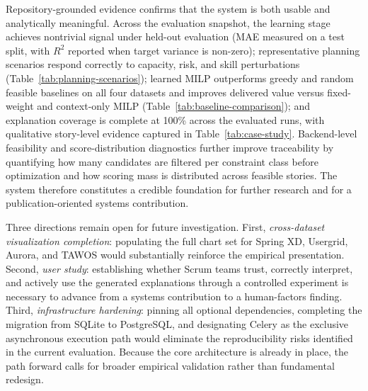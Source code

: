 \documentclass[conference]{IEEEtran}
\begin{document}
Repository-grounded evidence confirms that the system is both usable and
analytically meaningful.
Across the evaluation snapshot, the learning stage achieves nontrivial signal
under held-out evaluation (MAE measured on a test split, with $R^2$ reported when
target variance is non-zero); representative planning scenarios respond
correctly to capacity, risk, and skill perturbations
(Table~\ref{tab:planning-scenarios}); learned MILP outperforms greedy and random
feasible baselines on all four datasets and improves delivered value versus
fixed-weight and context-only MILP (Table~\ref{tab:baseline-comparison}); and explanation
coverage is complete at 100\% across the evaluated runs, with qualitative
story-level evidence captured in Table~\ref{tab:case-study}.
Backend-level feasibility and score-distribution diagnostics further improve
traceability by quantifying how many candidates are filtered per constraint class
before optimization and how scoring mass is distributed across feasible stories.
The system therefore constitutes a credible foundation for further research and for
a publication-oriented systems contribution.

Three directions remain open for future investigation.
First, \emph{cross-dataset visualization completion}: populating the full chart set
for Spring XD, Usergrid, Aurora, and TAWOS would substantially reinforce the
empirical presentation.
Second, \emph{user study}: establishing whether Scrum teams trust, correctly
interpret, and actively use the generated explanations through a controlled
experiment is necessary to advance from a systems contribution to a human-factors
finding.
Third, \emph{infrastructure hardening}: pinning all optional dependencies, completing
the migration from SQLite to PostgreSQL, and designating Celery as the exclusive
asynchronous execution path would eliminate the reproducibility risks identified in
the current evaluation.
Because the core architecture is already in place, the path forward calls for
broader empirical validation rather than fundamental redesign.

\balance
\end{document}
